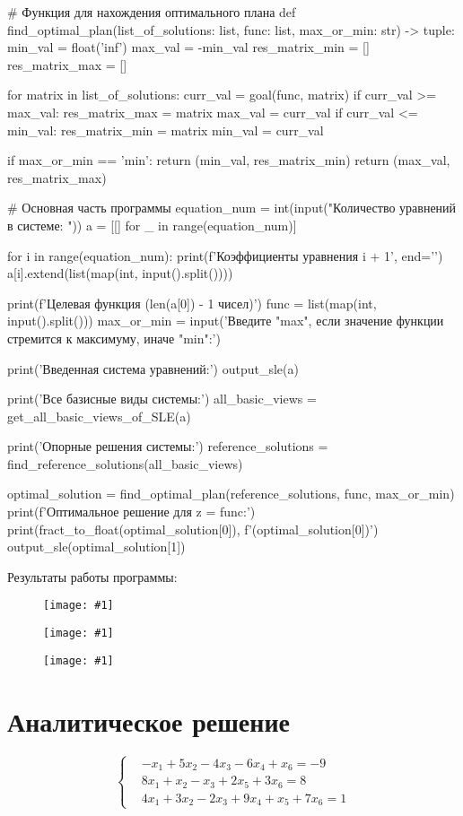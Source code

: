 \documentclass{report}
\newcommand{\drawsosal}[2]{
	\begin{figure}[H]
		\centering
		\texttt{[image: \#1]}
	\end{figure}
}
\begin{document}
\begin{code}
# Функция для нахождения оптимального плана
def find_optimal_plan(list_of_solutions: list, func: list, max_or_min: str) -> tuple:
   min_val = float('inf')
   max_val = -min_val
   res_matrix_min = []
   res_matrix_max = []

   for matrix in list_of_solutions:
	   curr_val = goal(func, matrix)
	   if curr_val >= max_val:
		   res_matrix_max = matrix
		   max_val = curr_val
	   if curr_val <= min_val:
		   res_matrix_min = matrix
		   min_val = curr_val

   if max_or_min == 'min':
	   return (min_val, res_matrix_min)
   return (max_val, res_matrix_max)

# Основная часть программы
equation_num = int(input("Количество уравнений в системе: "))
a = [[] for _ in range(equation_num)]

for i in range(equation_num):
   print(f'Коэффициенты уравнения {i + 1}', end='\n')
   a[i].extend(list(map(int, input().split())))

print(f'Целевая функция ({len(a[0]) - 1} чисел)')
func = list(map(int, input().split()))
max_or_min = input('Введите "max", если значение функции стремится к максимуму, иначе "min":\n')

print('Введенная система уравнений:')
output_sle(a)

print('Все базисные виды системы:')
all_basic_views = get_all_basic_views_of_SLE(a)
		
print('Опорные решения системы:')
reference_solutions = find_reference_solutions(all_basic_views)
		
optimal_solution = find_optimal_plan(reference_solutions, func, max_or_min)
print(f'Оптимальное решение для z = {func}:')
print(fract_to_float(optimal_solution[0]), f'({optimal_solution[0]})')
output_sle(optimal_solution[1])
	\end{code}
	
	\newpage

	Результаты работы программы:

	\drawsosal{images/1.png}{0.6}
	
	\drawsosal{images/2.png}{0.6}

	\drawsosal{images/3.png}{0.6}
	
	\newpage
	
	\chapter{Аналитическое решение}
	
	\[
\left\{
\begin{aligned}
	&-x_1 + 5x_2 - 4x_3 - 6x_4 + x_6 = -9 \\
	&8x_1 + x_2 - x_3 + 2x_5 + 3x_6 = 8 \\
	&4x_1 + 3x_2 - 2x_3 + 9x_4 + x_5 + 7x_6 = 1
\end{aligned}
\right.
\]
\end{document}

